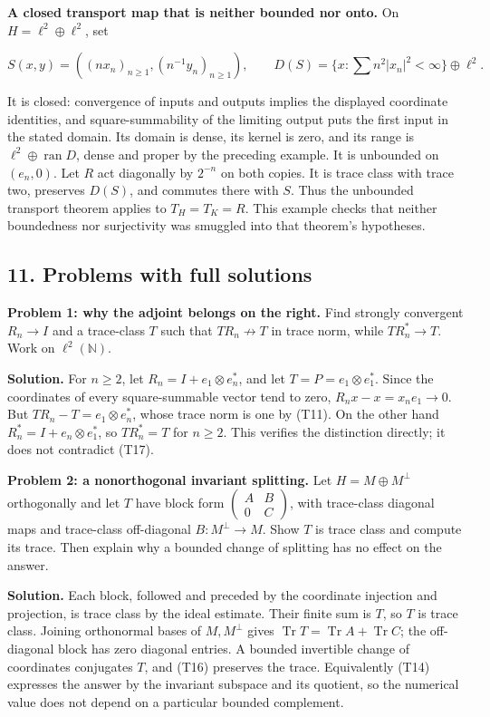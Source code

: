 \documentclass[
  11pt,
]{article}
\begin{document}
\textbf{A closed transport map that is neither bounded nor onto.} On
\(H=\ell^2\oplus\ell^2\), set

\[
S(x,y)=((nx_n)_{n\geq1},(n^{-1}y_n)_{n\geq1}),\qquad
D(S)=\{x:\sum n^2|x_n|^2<\infty\}\oplus\ell^2.
\]

It is closed: convergence of inputs and outputs implies the displayed
coordinate identities, and square-summability of the limiting output
puts the first input in the stated domain. Its domain is dense, its
kernel is zero, and its range is \(\ell^2\oplus\operatorname{ran}D\),
dense and proper by the preceding example. It is unbounded on
\((e_n,0)\). Let \(R\) act diagonally by \(2^{-n}\) on both copies. It
is trace class with trace two, preserves \(D(S)\), and commutes there
with \(S\). Thus the unbounded transport theorem applies to
\(T_H=T_K=R\). This example checks that neither boundedness nor
surjectivity was smuggled into that theorem's hypotheses.

\subsection{11. Problems with full
solutions}\label{problems-with-full-solutions}

\textbf{Problem 1: why the adjoint belongs on the right.} Find strongly
convergent \(R_n\to I\) and a trace-class \(T\) such that
\(TR_n\not\to T\) in trace norm, while \(TR_n^*\to T\). Work on
\(\ell^2(\mathbb N)\).

\textbf{Solution.} For \(n\geq2\), let \(R_n=I+e_1\otimes e_n^*\), and
let \(T=P=e_1\otimes e_1^*\). Since the coordinates of every
square-summable vector tend to zero, \(R_nx-x=x_ne_1\to0\). But
\(TR_n-T=e_1\otimes e_n^*\), whose trace norm is one by (T11). On the
other hand \(R_n^*=I+e_n\otimes e_1^*\), so \(TR_n^*=T\) for \(n\geq2\).
This verifies the distinction directly; it does not contradict (T17).

\textbf{Problem 2: a nonorthogonal invariant splitting.} Let
\(H=M\oplus M^\perp\) orthogonally and let \(T\) have block form
\(\begin{pmatrix}A&B\\0&C\end{pmatrix}\), with trace-class diagonal maps
and trace-class off-diagonal \(B:M^\perp\to M\). Show \(T\) is trace
class and compute its trace. Then explain why a bounded change of
splitting has no effect on the answer.

\textbf{Solution.} Each block, followed and preceded by the coordinate
injection and projection, is trace class by the ideal estimate. Their
finite sum is \(T\), so \(T\) is trace class. Joining orthonormal bases
of \(M,M^\perp\) gives
\(\operatorname{Tr}T=\operatorname{Tr}A+\operatorname{Tr}C\); the
off-diagonal block has zero diagonal entries. A bounded invertible
change of coordinates conjugates \(T\), and (T16) preserves the trace.
Equivalently (T14) expresses the answer by the invariant subspace and
its quotient, so the numerical value does not depend on a particular
bounded complement.
\end{document}
